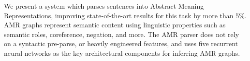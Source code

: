 We present a system which parses sentences into Abstract Meaning Representations, improving state-of-the-art results for this task by more than 5\%.  AMR graphs represent semantic content using linguistic properties such as semantic roles, coreference, negation, and more.  The AMR parser does not rely on a syntactic pre-parse, or heavily engineered features, and uses five recurrent neural networks as the key architectural components for inferring AMR graphs.
